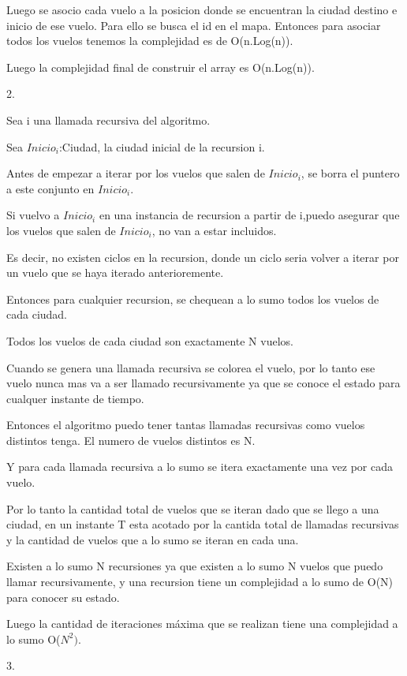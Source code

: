 Luego se asocio cada vuelo a la posicion donde se encuentran la ciudad destino e inicio de ese vuelo.
Para ello se busca el id en el mapa. Entonces para asociar todos los vuelos tenemos la complejidad es de O(n.Log(n)).

Luego la complejidad final de construir el array es O(n.Log(n)).

2.

Sea i una llamada recursiva del algoritmo.

Sea $Inicio_{i}$:Ciudad, la ciudad inicial de la recursion i.



Antes de empezar a iterar por los vuelos que salen de $Inicio_{i}$, se borra el puntero a este conjunto en $Inicio_{i}$.

Si vuelvo a $Inicio_{i}$ en una instancia de recursion a partir de i,puedo asegurar que los vuelos que salen de $Inicio_{i}$, no van a estar incluidos.

Es decir, no existen ciclos en la recursion, donde un ciclo seria volver a iterar por un vuelo que se haya iterado anterioremente.

Entonces para cualquier recursion, se chequean a lo sumo todos los vuelos de cada ciudad.

Todos los vuelos de cada ciudad son exactamente N vuelos.

Cuando se genera una llamada recursiva se colorea el vuelo, por lo tanto ese vuelo nunca mas va a ser llamado recursivamente ya que se conoce el estado para cualquer instante de tiempo.

Entonces el algoritmo puedo tener tantas llamadas recursivas como vuelos distintos tenga.
El numero de vuelos distintos es N.

Y para cada llamada recursiva a lo sumo se itera exactamente una vez por cada vuelo.

Por lo tanto la cantidad total de vuelos que se iteran dado que se llego a una ciudad, en un instante T esta acotado por la cantida total de llamadas recursivas y la cantidad de vuelos que a lo sumo se iteran en cada una.

Existen a lo sumo N recursiones ya que existen a lo sumo N vuelos que puedo llamar recursivamente, y una recursion tiene un complejidad a lo sumo de O(N) para conocer su estado.

Luego la cantidad de iteraciones m\'axima que se realizan tiene una complejidad a lo sumo O($N^{2})$.

3.


